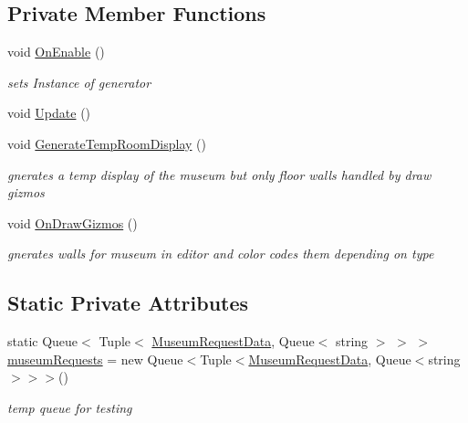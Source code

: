 \subsection*{Private Member Functions}
\begin{DoxyCompactItemize}
\item 
void \mbox{\hyperlink{class_museum_generator_abc3127d3a23107a350064fc49c5495c1}{On\+Enable}} ()
\begin{DoxyCompactList}\small\item\em sets Instance of generator \end{DoxyCompactList}\item 
void \mbox{\hyperlink{class_museum_generator_afa0b7c3e8ab1bccedc4c7828cbf4724e}{Update}} ()
\item 
void \mbox{\hyperlink{class_museum_generator_a1b9419222535f317005ca9fe1fe757f3}{Generate\+Temp\+Room\+Display}} ()
\begin{DoxyCompactList}\small\item\em gnerates a temp display of the museum but only floor walls handled by draw gizmos \end{DoxyCompactList}\item 
void \mbox{\hyperlink{class_museum_generator_a7c219625d39af0857271734995728a10}{On\+Draw\+Gizmos}} ()
\begin{DoxyCompactList}\small\item\em gnerates walls for museum in editor and color codes them depending on type \end{DoxyCompactList}\end{DoxyCompactItemize}
\subsection*{Static Private Attributes}
\begin{DoxyCompactItemize}
\item 
static Queue$<$ Tuple$<$ \mbox{\hyperlink{class_museum_request_data}{Museum\+Request\+Data}}, Queue$<$ string $>$ $>$ $>$ \mbox{\hyperlink{class_museum_generator_a10e2f6523a8d57b8265dab775c85b9f6}{museum\+Requests}} = new Queue$<$Tuple$<$\mbox{\hyperlink{class_museum_request_data}{Museum\+Request\+Data}}, Queue$<$string$>$$>$$>$()
\begin{DoxyCompactList}\small\item\em temp queue for testing \end{DoxyCompactList}\end{DoxyCompactItemize}


